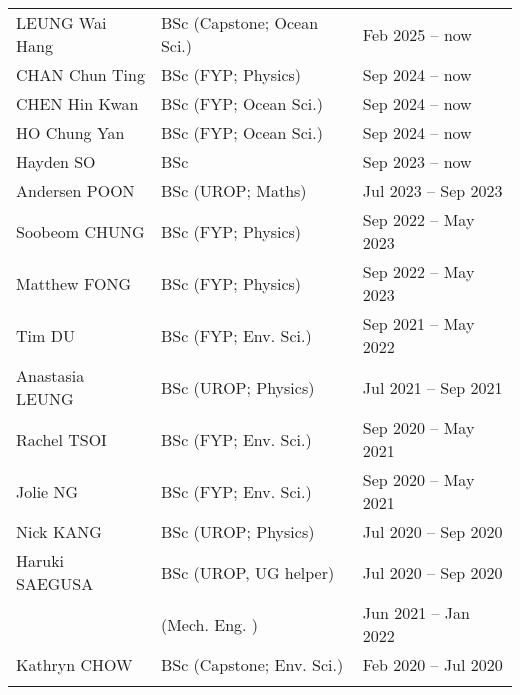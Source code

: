 \documentclass[letterpaper]{article}
\begin{document}
\begin{tabularx}{\textwidth}{XXX}
  LEUNG Wai Hang          & BSc (Capstone; Ocean Sci.) & Feb 2025 -- now\\
  CHAN Chun Ting          & BSc (FYP; Physics)    & Sep 2024 -- now\\
  CHEN Hin Kwan           & BSc (FYP; Ocean Sci.) & Sep 2024 -- now\\
  HO Chung Yan            & BSc (FYP; Ocean Sci.) & Sep 2024 -- now\\
  Hayden SO               & BSc                   & Sep 2023 -- now\\
  Andersen POON           & BSc (UROP; Maths)     & Jul 2023 -- Sep 2023\\
  Soobeom CHUNG           & BSc (FYP; Physics)    & Sep 2022 -- May 2023\\
  Matthew FONG            & BSc (FYP; Physics)    & Sep 2022 -- May 2023\\
  Tim DU                  & BSc (FYP; Env. Sci.)  & Sep 2021 -- May 2022\\
  Anastasia LEUNG         & BSc (UROP; Physics)   & Jul 2021 -- Sep 2021\\
  Rachel TSOI             & BSc (FYP; Env. Sci.)  & Sep 2020 -- May 2021\\
  Jolie NG                & BSc (FYP; Env. Sci.)  & Sep 2020 -- May 2021\\
  Nick KANG               & BSc (UROP; Physics)   & Jul 2020 -- Sep 2020\\
  Haruki SAEGUSA          & BSc (UROP, UG helper) & Jul 2020 -- Sep 2020\\
                          &     (Mech. Eng.     ) & Jun 2021 -- Jan 2022\\
  Kathryn CHOW            & BSc (Capstone; Env. Sci.)  & Feb 2020 -- Jul 2020\\
  \\
\end{tabularx}

\end{document}
